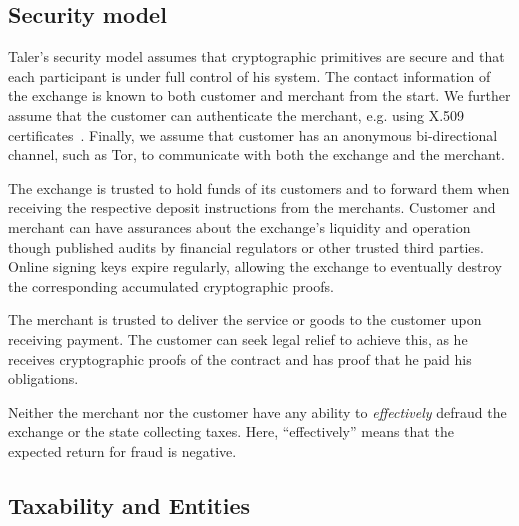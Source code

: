 \documentclass{llncs}
\begin{document}
\subsection{Security model}

Taler's security model assumes that cryptographic primitives are
secure and that each participant is under full control of his system.
The contact information of the exchange is known to both customer and
merchant from the start.  We further assume that the customer can
authenticate the merchant, e.g. using X.509
certificates~\cite{rfc5280}.  Finally, we assume that customer has an
anonymous bi-directional channel, such as Tor, to communicate with
both the exchange and the merchant.

The exchange is trusted to hold funds of its customers and to forward
them when receiving the respective deposit instructions from the
merchants.  Customer and merchant can have assurances about the
exchange's liquidity and operation though published audits by
financial regulators or other trusted third parties.
Online signing keys expire regularly, allowing the exchange to
eventually destroy the corresponding accumulated cryptographic proofs.

The merchant is trusted to deliver the service or goods to the
customer upon receiving payment.  The customer can seek legal relief
to achieve this, as he receives cryptographic proofs of the contract
and has proof that he paid his obligations.

Neither the merchant nor the customer have any ability to {\em effectively}
defraud the exchange or the state collecting taxes.  Here, ``effectively''
means that the expected return for fraud is negative.
%

\subsection{Taxability and Entities}
\end{document}
